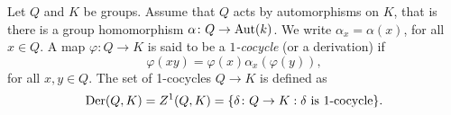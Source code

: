 %
%
%
%
%	
%	
%


Let $Q$ and $K$ be groups. Assume that $Q$ acts by automorphisms on $K$, that is there is a group homomorphism $\alpha\colon Q\rightarrow \operatorname{Aut}(k)$. We write $\alpha_x=\alpha(x)$, for all $x\in Q$.
A map $\varphi\colon Q\to K$ is said to be a {\em $1$-cocycle} (or a derivation) if
\[
		\varphi(xy)=\varphi(x)\alpha_x(\varphi(y)),
\]
for all $x,y\in Q$.  The set of 1-cocycles $Q\to K$ is defined as 
\[
\operatorname{Der}(Q,K)=Z^1(Q,K)=\{\delta\colon Q\to K:\text{$\delta$ is $1$-cocycle}\}.
\]

